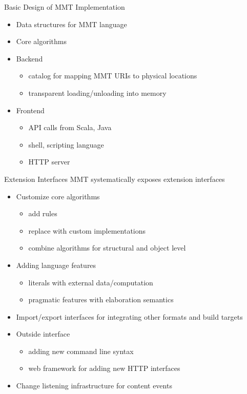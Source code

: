 \documentclass{beamer}
\begin{document}
\begin{myframe}{Basic Design of MMT Implementation}
\begin{itemize}
 \item Data structures for MMT language
 \item Core algorithms
 \item Backend
  \begin{itemize}
    \item catalog for mapping MMT URIs to physical locations
    \item transparent loading/unloading into memory
  \end{itemize}
 \item Frontend
  \begin{itemize}
    \item API calls from Scala, Java
    \item shell, scripting language
    \item HTTP server
   \end{itemize}
\end{itemize}
\end{myframe}

\begin{myframe}{Extension Interfaces}
MMT systematically exposes extension interfaces
\begin{itemize}
 \item Customize core algorithms
   \begin{itemize}
    \item add rules
    \item replace with custom implementations
    \item combine algorithms for structural and object level
   \end{itemize}
 \item Adding language features
   \begin{itemize}
     \item literals with external data/computation
     \item pragmatic features with elaboration semantics
   \end{itemize} 
 \item Import/export interfaces for integrating other formats and build targets
 \item Outside interface
  \begin{itemize}
    \item adding new command line syntax
    \item web framework for adding new HTTP interfaces
  \end{itemize}
 \item Change listening infrastructure for content events
\end{itemize}
\end{myframe}
\end{document}

